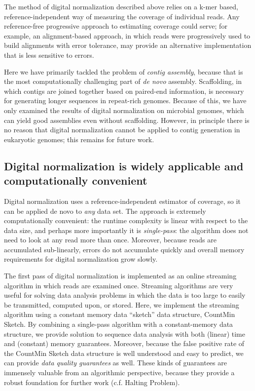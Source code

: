 \documentclass[10pt]{article}
\begin{document}
The method of digital normalization described above relies on a k-mer
based, reference-independent way of measuring the coverage of
individual reads.  Any reference-free progressive approach to
estimating coverage could serve; for example, an alignment-based
approach, in which reads were progressively used to build alignments
with error tolerance, may provide an alternative implementation that
is less sensitive to errors.

Here we have primarily tackled the problem of {\em contig assembly},
because that is the most computationally challenging part of {\em de
  novo} assembly.  Scaffolding, in which contigs are joined together
based on paired-end information, is necessary for generating longer
sequences in repeat-rich genomes.  Because of this, we have only
examined the results of digital normalization on microbial genomes,
which can yield good assemblies even without scaffolding.  However, in
principle there is no reason that digital normalization cannot be
applied to contig generation in eukaryotic genomes; this remains for
future work.

\subsection*{Digital normalization is widely applicable and computationally convenient}

Digital normalization uses a reference-independent estimator of
coverage, so it can be applied de novo to {\em any} data set.  The
approach is extremely computationally convenient: the runtime
complexity is linear with respect to the data size, and perhaps more
importantly it is {\em single-pass}: the algorithm does not need to
look at any read more than once.  Moreover, because reads are
accumulated sub-linearly, errors do not accumulate quickly and overall
memory requirements for digital normalization grow slowly.

The first pass of digital normalization is implemented as an online streaming
algorithm in which reads are examined once.  Streaming algorithms are very useful for solving data analysis
problems in which the data is too large to easily be transmitted,
computed upon, or stored.  Here, we implement the streaming algorithm
using a constant memory data ``sketch'' data structure, CountMin
Sketch.  By combining a single-pass algorithm with a constant-memory
data structure, we provide solution to sequence data analysis with
both (linear) time and (constant) memory guarantees. Moreover, because
the false positive rate of the CountMin Sketch data structure is well
understood and easy to predict, we can provide {\em data quality
guarantees} as well.  These kinds of guarantees are immensely
valuable from an algorithmic perspective, because they provide a
robust foundation for further work (c.f. Halting Problem).
\end{document}
